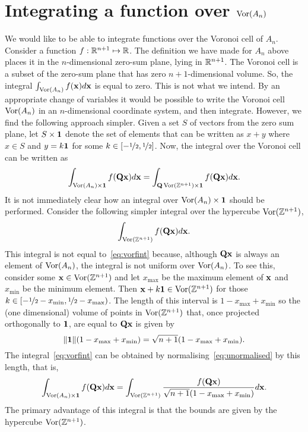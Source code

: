 \documentclass[draftcls, onecolumn, 11pt]{IEEEtran}
\begin{document}
\section{Integrating a function over $\operatorname{Vor}(A_n)$}\label{sec:integr-funct-over}

We would like to be able to integrate functions over the Voronoi cell of $A_n$.  Consider a function $f : {\mathbb R}^{n+1} \mapsto {\mathbb R}$.  The definition we have made for $A_n$ above places it in the $n$-dimensional zero-sum plane, lying in ${\mathbb R}^{n+1}$.  The Voronoi cell is a subset of the zero-sum plane that has zero $n+1$-dimensional volume.  So, the integral $\int_{\operatorname{Vor}(A_n)} f(\mathbf{x}) d \mathbf{x}$ is equal to zero.  This is not what we intend.  By an appropriate change of variables it would be possible to write the Voronoi cell $\operatorname{Vor}(A_n)$ in an $n$-dimensional coordinate system, and then integrate.  However, we find the following approach simpler.  Given a set $S$ of vectors from the zero sum plane, let $S \times \boldsymbol{1}$ denote the set of elements that can be written as $x + y$ where $x \in S$ and $y = k\boldsymbol{1}$ for some $k \in [-\nicefrac{1}{2},\nicefrac{1}{2}]$.  Now, the integral over the Voronoi cell can be written as
\begin{equation}\label{eq:vorfint}
\int_{\vor(A_n) \times \onebf} f(\Qbf\xbf) d\xbf = \int_{\Qbf\vor(\ints^{n+1}) \times \onebf} f(\Qbf\xbf) d\xbf.
\end{equation}
It is not immediately clear how an integral over $\operatorname{Vor}(A_n) \times \boldsymbol{1}$ should be performed.  Consider the following simpler integral over the hypercube $\operatorname{Vor}({\mathbb Z}^{n+1})$,
\begin{equation}\label{eq:unormalised}
\int_{\vor(\ints^{n+1})} f(\Qbf\xbf) d\xbf.
\end{equation}
This integral is not equal to~\eqref{eq:vorfint} because, although $\mathbf{Q}\mathbf{x}$ is always an element of $\operatorname{Vor}(A_n)$, the integral is not uniform over $\operatorname{Vor}(A_n)$.  To see this, consider some $\mathbf{x} \in \operatorname{Vor}({\mathbb Z}^{n+1})$ and let $x_{\text{max}}$ be the maximum element of $\mathbf{x}$ and $x_{\text{min}}$ be the minimum element.  Then $\mathbf{x} +  k \boldsymbol{1} \in \operatorname{Vor}({\mathbb Z}^{n+1})$ for those $k \in [-\nicefrac{1}{2} - x_{\text{min}}, \nicefrac{1}{2} - x_{\text{max}})$.  The length of this interval is $1 - x_{\text{max}} + x_{\text{min}}$ so the (one dimensional) volume of points in $\operatorname{Vor}({\mathbb Z}^{n+1})$ that, once projected orthogonally to $\boldsymbol{1}$, are equal to $\mathbf{Q}\mathbf{x}$ is given by
\[
\|\boldsymbol{1}\|(1 - x_{\text{max}} + x_{\text{min}}) = \sqrt{n+1}(1 - x_{\text{max}} + x_{\text{min}}).
\]
The integral~\eqref{eq:vorfint} can be obtained by normalising~\eqref{eq:unormalised} by this length, that is,
\[
\int_{\operatorname{Vor}(A_n) \times \boldsymbol{1}} f(\mathbf{Q}\mathbf{x}) d\mathbf{x} =  \int_{\operatorname{Vor}({\mathbb Z}^{n+1})} \frac{f(\mathbf{Q}\mathbf{x})}{\sqrt{n+1}(1 - x_{\text{max}} + x_{\text{min}})}  d\mathbf{x}.
\]
The primary advantage of this integral is that the bounds are given by the hypercube $\operatorname{Vor}({\mathbb Z}^{n+1})$.
\end{document}
